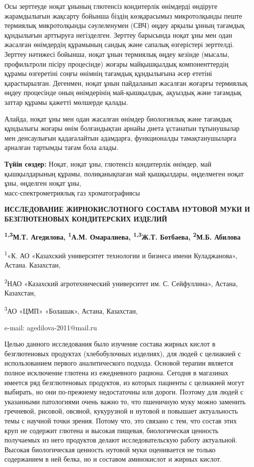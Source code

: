 Осы зерттеуде ноқат ұнының глютенсіз кондитерлік өнімдерді өндіруге
жарамдылығын жақсарту бойынша біздің көзқарасымыз микротолқынды пеште
термиялық микротолқынды сәулеленумен (СВЧ) өңдеу арқылы ұнның тағамдық
құндылығын арттыруға негізделген. Зерттеу барысында ноқат ұны мен одан
жасалған өнімдердің құрамының сандық және сапалық өзгерістері зерттелді.
Зерттеу нәтижесі бойынша, ноқат ұнын термиялық өңдеу кезінде (мысалы,
профильтроли пісіру процесінде) жоғары майқышқылдық компоненттердің
құрамы өзгеретіні соңғы өнімнің тағамдық құндылығына әсер ететіні
қарастырылған. Дегенмен, ноқат ұнын пайдаланып жасалған жоғарғы
термиялық өңдеу процесінде оның өнімдерінің май-қышқылдық, ақуыздық және
тағамдық заттар құрамы қажетті мөлшерде қалады.

Алайда, ноқат ұны мен одан жасалған өнімдер биологиялық және тағамдық
құндылығы жоғары өнім болғандықтан арнайы диета ұстанатын тұтынушылар
мен денсаулығын қадағалайтын адамдарға, функционалды тамақтанушыларға
арналған тартымды тағам бола алады.

{\bfseries Түйін сөздер:} Ноқат, ноқат ұны, глютенсіз кондитерлік өнімдер,
май қышқылдарының құрамы, полиқанықпаған май қышқылдары, өңделмеген
ноқат ұны, өңделген ноқат ұны, \\масс-спектрометриялық газ хроматографиясы
\begin{articleheader}

{\bfseries ИССЛЕДОВАНИЕ ЖИРНОКИСЛОТНОГО СОСТАВА НУТОВОЙ МУКИ И
БЕЗГЛЮТЕНОВЫХ КОНДИТЕРСКИХ ИЗДЕЛИЙ}

{\bfseries \textsuperscript{1,3}М.Т. Агедилова\textsuperscript{\envelope },
\textsuperscript{1}А.М. Омаралиева, \textsuperscript{1,3}Ж.Т. Ботбаева,
\textsuperscript{2}М.Б. Абилова}
\end{articleheader}
\begin{affiliation}
\textsuperscript{1}«К. АО «Казахский университет технологии и бизнеса
имени Куладжанова», Астана. Казахстан,

\textsuperscript{2}НАО «Казахский агротехнический университет им. С.
Сейфуллина», Астана, Казахстан,

\textsuperscript{3}АО «ЦМП» «Болашак», Астана, Казахстан,

e-mail: agedilova-2011@mail.ru
\end{affiliation}

Целью данного исследования было изучение состава жирных кислот в
безглютеновых продуктах (хлебобулочных изделиях), для людей с целиакией
с использованием первого аналитического подхода. Основой терапии
является полное исключение глютена из ежедневного рациона. Сегодня в
магазинах имеется ряд безглютеновых продуктов, из которых пациенты с
целиакией могут выбирать, но они по-прежнему недостаточны или дороги.
Поэтому для людей с указанными патологиями очень важно то, что пшеничную
муку можно заменить гречневой, рисовой, овсяной, кукурузной и нутовой и
повышает актуальность темы с научной точки зрения. Потому что, это
связано с тем, что состав этих круп не содержит глютена и высокая
пищевая, биологическая ценность получаемых из него продуктов делают
исследовательскую работу актуальной. Высокая биологическая ценность
нутовой муки оценивается не только содержанием в ней белка, но и
составом аминокислот и жирных кислот.

